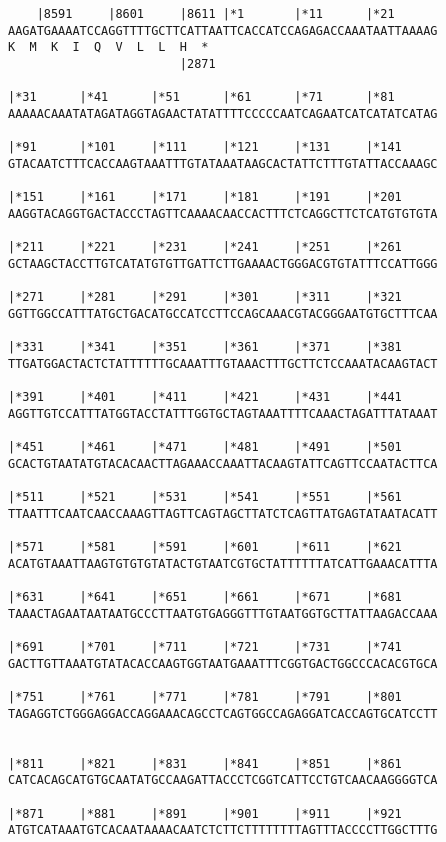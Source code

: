 \documentclass{article}
\begin{document}
\begin{Verbatim}
    |8591     |8601     |8611 |*1       |*11      |*21      
AAGATGAAAATCCAGGTTTTGCTTCATTAATTCACCATCCAGAGACCAAATAATTAAAAG
K  M  K  I  Q  V  L  L  H  *   
                        |2871                               
  
|*31      |*41      |*51      |*61      |*71      |*81      
AAAAACAAATATAGATAGGTAGAACTATATTTTCCCCCAATCAGAATCATCATATCATAG
  
|*91      |*101     |*111     |*121     |*131     |*141     
GTACAATCTTTCACCAAGTAAATTTGTATAAATAAGCACTATTCTTTGTATTACCAAAGC
  
|*151     |*161     |*171     |*181     |*191     |*201     
AAGGTACAGGTGACTACCCTAGTTCAAAACAACCACTTTCTCAGGCTTCTCATGTGTGTA
  
|*211     |*221     |*231     |*241     |*251     |*261     
GCTAAGCTACCTTGTCATATGTGTTGATTCTTGAAAACTGGGACGTGTATTTCCATTGGG
  
|*271     |*281     |*291     |*301     |*311     |*321     
GGTTGGCCATTTATGCTGACATGCCATCCTTCCAGCAAACGTACGGGAATGTGCTTTCAA
  
|*331     |*341     |*351     |*361     |*371     |*381     
TTGATGGACTACTCTATTTTTTGCAAATTTGTAAACTTTGCTTCTCCAAATACAAGTACT
  
|*391     |*401     |*411     |*421     |*431     |*441     
AGGTTGTCCATTTATGGTACCTATTTGGTGCTAGTAAATTTTCAAACTAGATTTATAAAT
  
|*451     |*461     |*471     |*481     |*491     |*501     
GCACTGTAATATGTACACAACTTAGAAACCAAATTACAAGTATTCAGTTCCAATACTTCA
  
|*511     |*521     |*531     |*541     |*551     |*561     
TTAATTTCAATCAACCAAAGTTAGTTCAGTAGCTTATCTCAGTTATGAGTATAATACATT
  
|*571     |*581     |*591     |*601     |*611     |*621     
ACATGTAAATTAAGTGTGTGTATACTGTAATCGTGCTATTTTTTATCATTGAAACATTTA
  
|*631     |*641     |*651     |*661     |*671     |*681     
TAAACTAGAATAATAATGCCCTTAATGTGAGGGTTTGTAATGGTGCTTATTAAGACCAAA
  
|*691     |*701     |*711     |*721     |*731     |*741     
GACTTGTTAAATGTATACACCAAGTGGTAATGAAATTTCGGTGACTGGCCCACACGTGCA
  
|*751     |*761     |*771     |*781     |*791     |*801     
TAGAGGTCTGGGAGGACCAGGAAACAGCCTCAGTGGCCAGAGGATCACCAGTGCATCCTT
  
  
|*811     |*821     |*831     |*841     |*851     |*861     
CATCACAGCATGTGCAATATGCCAAGATTACCCTCGGTCATTCCTGTCAACAAGGGGTCA
  
|*871     |*881     |*891     |*901     |*911     |*921     
ATGTCATAAATGTCACAATAAAACAATCTCTTCTTTTTTTTAGTTTACCCCTTGGCTTTG
  

\end{Verbatim}
\end{document}
